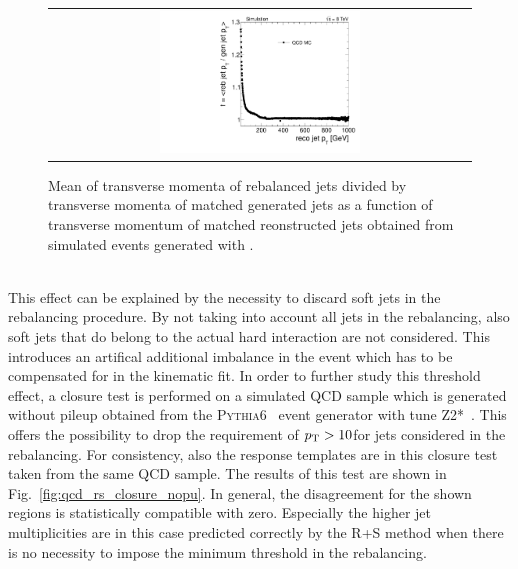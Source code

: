 \begin{figure}[!t]
  \centering
  \begin{tabular}{c}
                \includegraphics[width=0.49\textwidth]{figures/RebalanceCorrectionFactors_DR53X_chsJets_TuneZ2star_withoutPUReweighting_pt10_vsRecoMadgraph.pdf} 
  \end{tabular}
  \caption{Mean of transverse momenta of rebalanced jets divided by transverse momenta of matched generated jets as a function of transverse momentum of matched reonstructed jets obtained from simulated events generated with \madgraph.}
  \label{fig:qcd_rs_rebfactor}
\end{figure}
\\
This effect can be explained by the necessity to discard soft jets in the rebalancing procedure. By not taking into account all jets in the rebalancing, also soft jets that do belong to the actual hard interaction are not considered. This introduces an artifical additional imbalance in the event which has to be compensated for in the kinematic fit. In order to further study this threshold effect, a closure test is performed on a simulated QCD sample which is generated without pileup obtained from the \textsc{Pythia6}~\cite{Sjostrand:2006za} event generator with tune Z2*~\cite{Chatrchyan:2013gfi}. This offers the possibility to drop the requirement of $p_{\text{T}} > 10$\gev for jets considered in the rebalancing. For consistency, also the response templates are in this closure test taken from the same QCD sample. The results of this test are shown in Fig.~\ref{fig:qcd_rs_closure_nopu}. In general, the disagreement for the shown regions is statistically compatible with zero. Especially the higher jet multiplicities are in this case predicted correctly by the R+S method when there is no necessity to impose the minimum \pt threshold in the rebalancing. 
